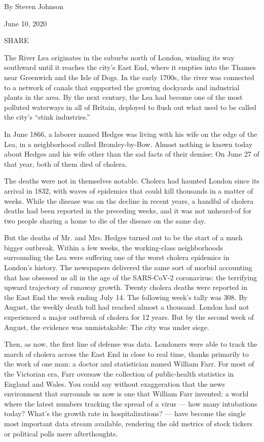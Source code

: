 By Steven Johnson

June 10, 2020

SHARE

The River Lea originates in the suburbs north of London, winding its way
southward until it reaches the city's East End, where it empties into
the Thames near Greenwich and the Isle of Dogs. In the early 1700s, the
river was connected to a network of canals that supported the growing
dockyards and industrial plants in the area. By the next century, the
Lea had become one of the most polluted waterways in all of Britain,
deployed to flush out what used to be called the city's ``stink
industries.''

In June 1866, a laborer named Hedges was living with his wife on the
edge of the Lea, in a neighborhood called Bromley-by-Bow. Almost nothing
is known today about Hedges and his wife other than the sad facts of
their demise: On June 27 of that year, both of them died of cholera.

The deaths were not in themselves notable. Cholera had haunted London
since its arrival in 1832, with waves of epidemics that could kill
thousands in a matter of weeks. While the disease was on the decline in
recent years, a handful of cholera deaths had been reported in the
preceding weeks, and it was not unheard-of for two people sharing a home
to die of the disease on the same day.

But the deaths of Mr. and Mrs. Hedges turned out to be the start of a
much bigger outbreak. Within a few weeks, the working-class
neighborhoods surrounding the Lea were suffering one of the worst
cholera epidemics in London's history. The newspapers delivered the same
sort of morbid accounting that has obsessed us all in the age of the
SARS-CoV-2 coronavirus: the terrifying upward trajectory of runaway
growth. Twenty cholera deaths were reported in the East End the week
ending July 14. The following week's tally was 308. By August, the
weekly death toll had reached almost a thousand. London had not
experienced a major outbreak of cholera for 12 years. But by the second
week of August, the evidence was unmistakable: The city was under siege.

Then, as now, the first line of defense was data. Londoners were able to
track the march of cholera across the East End in close to real time,
thanks primarily to the work of one man: a doctor and statistician named
William Farr. For most of the Victorian era, Farr oversaw the collection
of public-health statistics in England and Wales. You could say without
exaggeration that the news environment that surrounds us now is one that
William Farr invented: a world where the latest numbers tracking the
spread of a virus --- how many intubations today? What's the growth rate
in hospitalizations? --- have become the single most important data
stream available, rendering the old metrics of stock tickers or
political polls mere afterthoughts.

